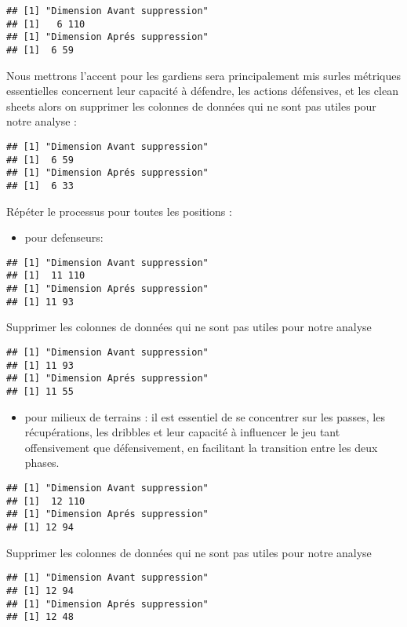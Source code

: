 \documentclass[
  6pt,
]{article}
\providecommand{\tightlist}{%
  \setlength{\itemsep}{0pt}\setlength{\parskip}{0pt}}
\begin{document}
\begin{verbatim}
## [1] "Dimension Avant suppression"
## [1]   6 110
## [1] "Dimension Aprés suppression"
## [1]  6 59
\end{verbatim}

Nous mettrons l'accent pour les gardiens sera principalement mis surles
métriques essentielles concernent leur capacité à défendre, les actions
défensives, et les clean sheets alors on supprimer les colonnes de
données qui ne sont pas utiles pour notre analyse :

\begin{verbatim}
## [1] "Dimension Avant suppression"
## [1]  6 59
## [1] "Dimension Aprés suppression"
## [1]  6 33
\end{verbatim}

Répéter le processus pour toutes les positions :

\begin{itemize}
\tightlist
\item
  pour defenseurs:
\end{itemize}

\begin{verbatim}
## [1] "Dimension Avant suppression"
## [1]  11 110
## [1] "Dimension Aprés suppression"
## [1] 11 93
\end{verbatim}

Supprimer les colonnes de données qui ne sont pas utiles pour notre
analyse

\begin{verbatim}
## [1] "Dimension Avant suppression"
## [1] 11 93
## [1] "Dimension Aprés suppression"
## [1] 11 55
\end{verbatim}

\begin{itemize}
\tightlist
\item
  pour milieux de terrains : il est essentiel de se concentrer sur les
  passes, les récupérations, les dribbles et leur capacité à influencer
  le jeu tant offensivement que défensivement, en facilitant la
  transition entre les deux phases.
\end{itemize}

\begin{verbatim}
## [1] "Dimension Avant suppression"
## [1]  12 110
## [1] "Dimension Aprés suppression"
## [1] 12 94
\end{verbatim}

Supprimer les colonnes de données qui ne sont pas utiles pour notre
analyse

\begin{verbatim}
## [1] "Dimension Avant suppression"
## [1] 12 94
## [1] "Dimension Aprés suppression"
## [1] 12 48
\end{verbatim}
\end{document}
